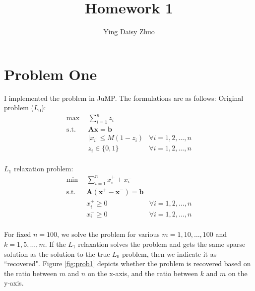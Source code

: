 \documentclass[12pt]{article}
\newcommand{\M}{\mathbf}
\newcommand{\1}{\mathds{1}}
\begin{document}
\title{Homework 1}
 
\author{Ying Daisy Zhuo}
%
\maketitle

\section{Problem One}

I implemented the problem in JuMP. The formulations are as follows:
Original problem ($L_0$):
\begin{equation}
\begin{aligned}
\max ~~&\sum_{i=1}^n z_i &\\
\textrm{s.t.} ~~& \M A \M x = \M b		&\\
			 & |x_i| \leq M(1-z_i)& \forall i=1, 2, \ldots, n\\
			 & z_i \in \{0, 1\}		& \forall i=1, 2, \ldots, n\\
\end{aligned}
\end{equation}

$L_1$ relaxation problem:
\begin{equation}
\begin{aligned}
\min ~~&\sum_{i=1}^n x^+_i + x^-_i &\\
\textrm{s.t.} ~~& \M A (\M x^+ - \M x^-) = \M b		&\\
			 & x^+_i \geq 0	& \forall i=1, 2, \ldots, n\\
			 & x^-_i \geq 0 	& \forall i=1, 2, \ldots, n\\
\end{aligned}
\end{equation}


For fixed $n = 100$, we solve the problem for various $m=1, 10, \ldots, 100$ and $k = 1, 5, \ldots, m$. If the $L_1$ relaxation solves the problem and gets the same sparse solution as the solution to the true $L_0$ problem, then we indicate it as ``recovered". Figure \ref{fig:prob1} depicts whether the problem is recovered based on the ratio between $m$ and $n$ on the x-axis, and the ratio between $k$ and $m$ on the y-axis.
\end{document}
